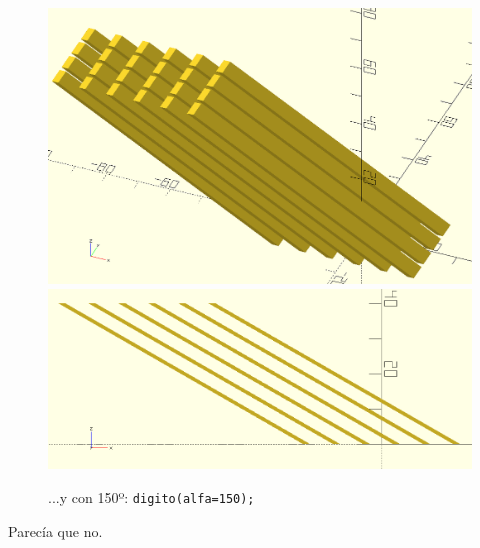     \begin{figure}[h!]
    \centering
  \includegraphics[width=.49\textwidth]{imagenes/matriz-150}\hfill
  \includegraphics[width=.49\textwidth]{imagenes/matriz-150-perfil} 
    \caption{...y con 150º: \lstinline!digito(alfa=150);!}%
    \label{fig:matriz-150}
  \end{figure}

    Parecía que no.




